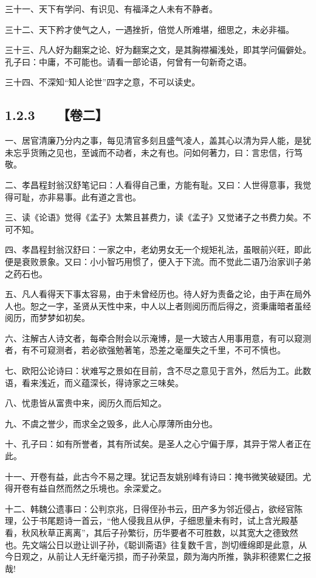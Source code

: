 \documentclass[letterpaper,12pt,english]{sphinxmanual}
\begin{document}
三十一、天下有学问、有识见、有福泽之人未有不静者。

三十二、天下矜才使气之人，一遇挫折，倍觉人所难堪，细思之，未必非福。

三十三、凡人好为翻案之论、好为翻案之文，是其胸襟褊浅处，即其学问偏僻处。孔子曰：中庸，不可能也。请看一部论语，何曾有一句新奇之语。

三十四、不深知“知人论世”四字之意，不可以读史。


\subsection{1.2.3   【卷二】}
\label{\detokenize{p00_u5176_u5b83/_u300a_u5f20_u82f1-_u806a_u8bad_u658b_u8bed_u300b_u300a_u5f20_u5ef7_u7389-_u6f84_u6000_u56ed_u8bed_u300b_u5408_u8f91:id10}}
一、居官清廉乃分内之事，每见清官多刻且盛气凌人，盖其心以清为异人能，是犹未忘乎货贿之见也，至诚而不动者，未之有也。问如何著力，曰：言忠信，行笃敬。

二、孝昌程封翁汉舒笔记曰：人看得自己重，方能有耻。又曰：人世得意事，我觉得可耻，亦非易事。此有道之言也。

三、读《论语》觉得《孟子》太繁且甚费力，读《孟子》又觉诸子之书费力矣。不可不知。

四、孝昌程封翁汉舒曰：一家之中，老幼男女无一个规矩礼法，虽眼前兴旺，即此便是衰败景象。又曰：小小智巧用惯了，便入于下流。而不觉此二语乃治家训子弟之药石也。

五、凡人看得天下事太容易，由于未曾经历也。待人好为责备之论，由于声在局外人也。恕之一字，圣贤从天性中来，中人以上者则阅历而后得之，资秉庸暗者虽经阅历，而梦梦如初矣。

六、注解古人诗文者，每牵合附会以示淹博，是一大玻古人用事用意，有可以窥测者，有不可窥测者，若必欲强勉著笔，恐差之毫厘失之千里，不可不慎也。

七、欧阳公论诗曰：状难写之景如在目前，含不尽之意见于言外，然后为工。此数语，看来浅近，而义蕴深长，得诗家之三味矣。

八、忧患皆从富贵中来，阅历久而后知之。

九、不虞之誉少，而求全之毁多，此人心厚薄所由分也。

十、孔子曰：如有所誉者，其有所试矣。是圣人之心宁偏于厚，其异于常人者正在此。

十一、开卷有益，此古今不易之理。犹记吾友姚别峰有诗曰：掩书微笑破疑团。尤得开卷有益自然而然之乐境也。余深爱之。

十二、韩魏公遗事曰：公判京兆，日得侄孙书云，田产多为邻近侵占，欲经官陈理，公于书尾题诗一首云，“他人侵我且从伊，子细思量未有时，试上含光殿基看，秋风秋草正离离”，其后子孙繁衍，历华要者不可胜数，以其宽大之德致然也。先文端公日以逊让训子孙，《聪训斋语》往复数千言，剀切缠绵即是此意，从今日观之，从前让人无纤毫污损，而子孙荣显，颇为海内所推，孰非积德累仁之报哉!
\end{document}

